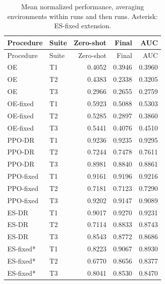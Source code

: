 {\small
\begin{longtable}{llrrr}
\caption{Mean normalized performance, averaging environments within runs and then runs. Asterisk: ES-fixed extension.}\label{tab:descriptives}\\
\toprule
Procedure & Suite & Zero-shot & Final & AUC\\\midrule
\endfirsthead
\toprule
Procedure & Suite & Zero-shot & Final & AUC\\\midrule
\endhead
\bottomrule\endfoot
OE & T1 & 0.4052 & 0.3946 & 0.3960\\
OE & T2 & 0.4383 & 0.2338 & 0.3205\\
OE & T3 & 0.2966 & 0.2655 & 0.2759\\
OE-fixed & T1 & 0.5923 & 0.5088 & 0.5303\\
OE-fixed & T2 & 0.5285 & 0.2897 & 0.3860\\
OE-fixed & T3 & 0.5441 & 0.4076 & 0.4510\\
PPO-DR & T1 & 0.9236 & 0.9235 & 0.9295\\
PPO-DR & T2 & 0.7244 & 0.7478 & 0.7611\\
PPO-DR & T3 & 0.8981 & 0.8840 & 0.8861\\
PPO-fixed & T1 & 0.9161 & 0.9196 & 0.9216\\
PPO-fixed & T2 & 0.7181 & 0.7123 & 0.7290\\
PPO-fixed & T3 & 0.9202 & 0.9147 & 0.9089\\
ES-DR & T1 & 0.9017 & 0.9270 & 0.9231\\
ES-DR & T2 & 0.7114 & 0.8833 & 0.8743\\
ES-DR & T3 & 0.8543 & 0.8772 & 0.8686\\
ES-fixed* & T1 & 0.8223 & 0.9067 & 0.8930\\
ES-fixed* & T2 & 0.6770 & 0.8656 & 0.8377\\
ES-fixed* & T3 & 0.8041 & 0.8530 & 0.8470\\
\end{longtable}
}
